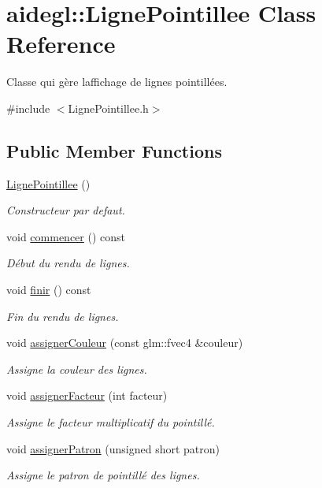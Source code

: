 \hypertarget{classaidegl_1_1_ligne_pointillee}{}\section{aidegl\+:\+:Ligne\+Pointillee Class Reference}
\label{classaidegl_1_1_ligne_pointillee}


Classe qui gère l\textquotesingle{}affichage de lignes pointillées.  




{\ttfamily \#include $<$Ligne\+Pointillee.\+h$>$}

\subsection*{Public Member Functions}
\begin{DoxyCompactItemize}
\item 
\hyperlink{classaidegl_1_1_ligne_pointillee_a4fc590690c8bbc7368fb355a71d5eaf2}{Ligne\+Pointillee} ()
\begin{DoxyCompactList}\small\item\em Constructeur par defaut. \end{DoxyCompactList}\item 
void \hyperlink{classaidegl_1_1_ligne_pointillee_a455e3f5a717d72b04808c90c3d20f23f}{commencer} () const 
\begin{DoxyCompactList}\small\item\em Début du rendu de lignes. \end{DoxyCompactList}\item 
void \hyperlink{classaidegl_1_1_ligne_pointillee_a5a1522b90f6970b3a33103935bed74da}{finir} () const 
\begin{DoxyCompactList}\small\item\em Fin du rendu de lignes. \end{DoxyCompactList}\item 
void \hyperlink{classaidegl_1_1_ligne_pointillee_a73fc1d54bcd3afd2861ea81a8b3721d0}{assigner\+Couleur} (const glm\+::fvec4 \&couleur)
\begin{DoxyCompactList}\small\item\em Assigne la couleur des lignes. \end{DoxyCompactList}\item 
void \hyperlink{classaidegl_1_1_ligne_pointillee_a0d9e3b0ca2604f1e9410b868a8917a78}{assigner\+Facteur} (int facteur)
\begin{DoxyCompactList}\small\item\em Assigne le facteur multiplicatif du pointillé. \end{DoxyCompactList}\item 
void \hyperlink{classaidegl_1_1_ligne_pointillee_a2eb75fea1bec5566ca4feae3612d7b5e}{assigner\+Patron} (unsigned short patron)
\begin{DoxyCompactList}\small\item\em Assigne le patron de pointillé des lignes. \end{DoxyCompactList}\end{DoxyCompactItemize}


